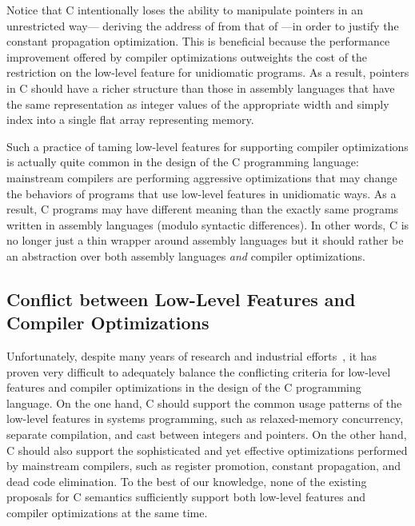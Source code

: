 Notice that C intentionally loses the ability to manipulate pointers in an unrestricted way---\eg{}
deriving the address of  from that of ---in order to justify the constant
propagation optimization.  This is beneficial because the performance improvement offered by
compiler optimizations outweights the cost of the restriction on the low-level feature for
unidiomatic programs.  As a result, pointers in C should have a richer structure than those in
assembly languages that have the same representation as integer values of the appropriate width and
simply index into a single flat array representing memory.

Such a practice of taming low-level features for supporting compiler optimizations is actually quite
common in the design of the C programming language: mainstream compilers are performing aggressive
optimizations that may change the behaviors of programs that use low-level features in unidiomatic
ways.  As a result, C programs may have different meaning than the exactly same programs written in
assembly languages (modulo syntactic differences).  In other words, C is no longer just a thin
wrapper around assembly languages but it should rather be an abstraction over both assembly
languages \emph{and} compiler optimizations.



\subsection{Conflict between Low-Level Features and Compiler Optimizations}
\label{sec:introduction:problem}

Unfortunately, despite many years of research and industrial efforts~\cite{c18}, it has proven very
difficult to adequately balance the conflicting criteria for low-level features and compiler
optimizations in the design of the C programming language.  On the one hand, C should support the
common usage patterns of the low-level features in systems programming, such as relaxed-memory
concurrency, separate compilation, and cast between integers and pointers.  On the other hand, C
should also support the sophisticated and yet effective optimizations performed by mainstream
compilers, such as register promotion, constant propagation, and dead code elimination.  To the best
of our knowledge, none of the existing proposals for C semantics sufficiently support both low-level
features and compiler optimizations at the same time.


